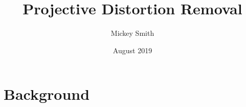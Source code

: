 \documentclass{article}
\title{Projective Distortion Removal}
\author{Mickey Smith}
\date{August 2019}
\begin{document}
\maketitle

\section{Background}
\end{document}
